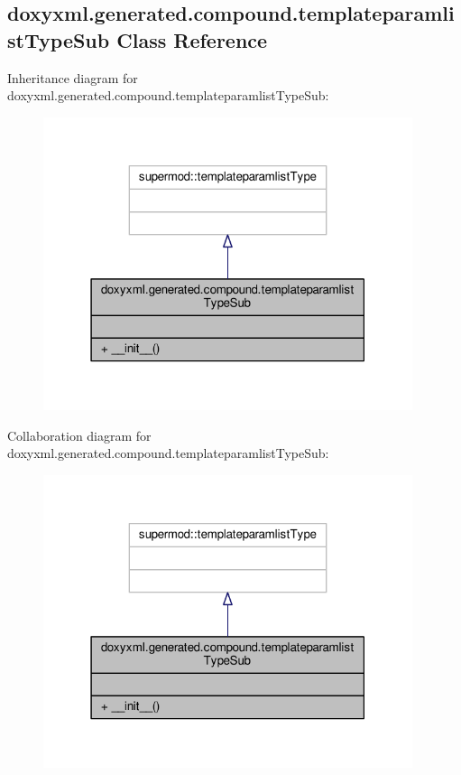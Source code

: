 \subsection{doxyxml.\+generated.\+compound.\+templateparamlist\+Type\+Sub Class Reference}
\label{classdoxyxml_1_1generated_1_1compound_1_1templateparamlistTypeSub}


Inheritance diagram for doxyxml.\+generated.\+compound.\+templateparamlist\+Type\+Sub\+:
\nopagebreak
\begin{figure}[H]
\begin{center}
\leavevmode
\includegraphics[width=307pt]{d3/db4/classdoxyxml_1_1generated_1_1compound_1_1templateparamlistTypeSub__inherit__graph}
\end{center}
\end{figure}


Collaboration diagram for doxyxml.\+generated.\+compound.\+templateparamlist\+Type\+Sub\+:
\nopagebreak
\begin{figure}[H]
\begin{center}
\leavevmode
\includegraphics[width=307pt]{da/d56/classdoxyxml_1_1generated_1_1compound_1_1templateparamlistTypeSub__coll__graph}
\end{center}
\end{figure}

